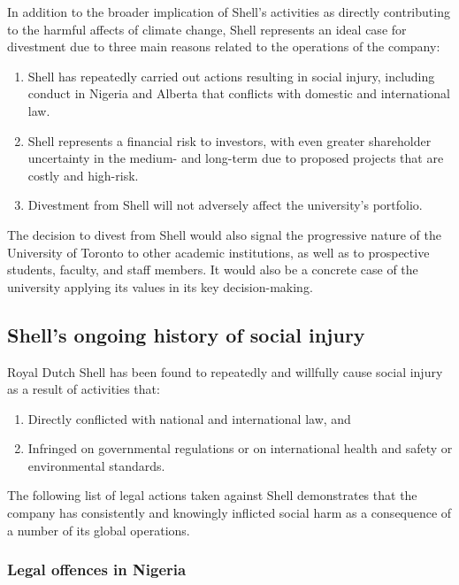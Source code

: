 			
In addition to the broader implication of Shell's activities as directly contributing to the harmful affects of climate change, Shell represents an ideal case for divestment due to three main reasons related to the operations of the company: 
\begin{enumerate}
	\item Shell has repeatedly carried out actions resulting in social injury, including conduct in Nigeria and Alberta that conflicts with domestic and international law.
	\item Shell represents a financial risk to investors, with even greater shareholder uncertainty in the medium- and long-term due to proposed projects that are costly and high-risk.
	\item Divestment from Shell will not adversely affect the university's portfolio.
\end{enumerate}
The decision to divest from Shell would also signal the progressive nature of the University of Toronto to other academic institutions, as well as to prospective students, faculty, and staff members.
It would also be a concrete case of the university applying its values in its key decision-making.



	\subsection{Shell's ongoing history of social injury}



Royal Dutch Shell has been found to repeatedly and willfully cause social injury as a result of activities that:
\begin{enumerate}
	\item Directly conflicted with national and international law, and
	\item Infringed on governmental regulations or on international health and safety or environmental standards. 
\end{enumerate}
The following list of legal actions taken against Shell demonstrates that the company has consistently and knowingly inflicted social harm as a consequence of a number of its global operations.



	\subsubsection{Legal offences in Nigeria}




